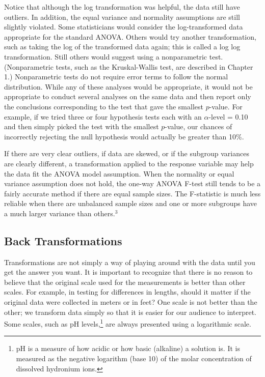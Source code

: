 \documentclass[
]{book}
\begin{document}
Notice that although the log transformation was helpful, the data still have outliers. In addition, the equal variance and normality assumptions are still slightly violated. Some statisticians would consider the log-transformed data appropriate for the standard ANOVA. Others would try another transformation, such as taking the log of the transformed data again; this is called a log log transformation. Still others would suggest using a nonparametric test. (Nonparametric tests, such as the Kruskal-Wallis test, are described in Chapter 1.) Nonparametric tests do not require error terms to follow the normal distribution. While any of these analyses would be appropriate, it would not be appropriate to conduct several analyses on the same data and then report only the conclusions corresponding to the test that gave the smallest \(p\)-value. For example, if we tried three or four hypothesis tests each with an \(\alpha\)-level = 0.10 and then simply picked the test with the smallest \(p\)-value, our chances of incorrectly rejecting the null hypothesis would actually be greater than 10\%.

If there are very clear outliers, if data are skewed, or if the subgroup variances are clearly different, a transformation applied to the response variable may help the data fit the ANOVA model assumption. When the normality or equal variance assumption does not hold, the one-way ANOVA F-test still tends to be a fairly accurate method if there are equal sample sizes. The F-statistic is much less reliable when there are unbalanced sample sizes and one or more subgroups have a much larger variance than others.\(^3\)

\hypertarget{back-transformations}{%
\subsection*{Back Transformations}\label{back-transformations}}

Transformations are not simply a way of playing around with the data until you get the answer you want. It is important to recognize that there is no reason to believe that the original scale used for the measurements is better than other scales. For example, in testing for differences in lengths, should it matter if the original data were collected in meters or in feet? One scale is not better than the other; we transform data simply so that it is easier for our audience to interpret. Some scales, such as pH levels,\footnote{pH is a measure of how acidic or how basic (alkaline) a solution is. It is measured as the negative logarithm (base 10) of the molar concentration of dissolved hydronium ions.} are always presented using a logarithmic scale.
\end{document}
